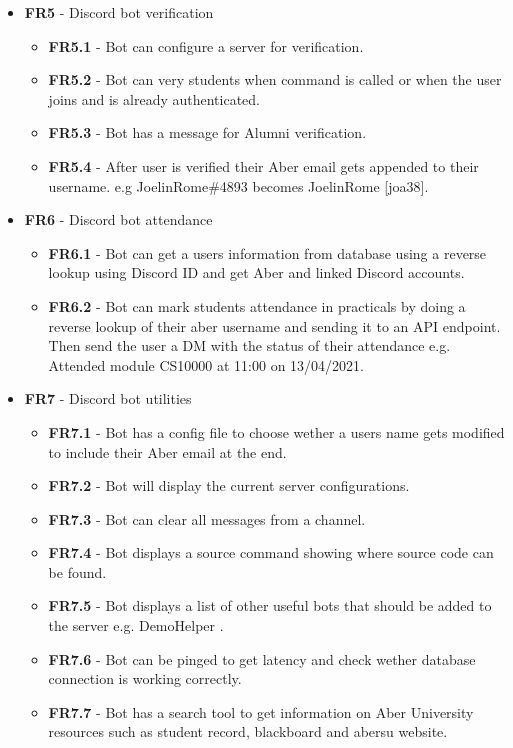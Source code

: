 \begin{itemize}
	\item \textbf{FR5} - Discord bot verification
	\begin{itemize}
		\item \textbf{FR5.1} - Bot can configure a server for verification.
		\item \textbf{FR5.2} - Bot can very students when command is called or when the user joins and is already authenticated.
		\item \textbf{FR5.3} - Bot has a message for Alumni verification.
		\item \textbf{FR5.4} - After user is verified their Aber email gets appended to their username. e.g JoelinRome\#4893 becomes JoelinRome [joa38].
	\end{itemize}

	\item \textbf{FR6} - Discord bot attendance
	\begin{itemize}
		\item \textbf{FR6.1} - Bot can get a users information from database using a reverse lookup using Discord ID and get Aber and linked Discord accounts.
		\item \textbf{FR6.2} - Bot can mark students attendance in practicals by doing a reverse lookup of their aber username and sending it to an API endpoint. Then send the user a DM with the status of their attendance e.g. Attended module CS10000 at 11:00 on 13/04/2021.
	\end{itemize}

	\item \textbf{FR7} - Discord bot utilities
	\begin{itemize}
		\item \textbf{FR7.1} - Bot has a config file to choose wether a users name gets modified to include their Aber email at the end.
		\item \textbf{FR7.2} - Bot will display the current server configurations.
		\item \textbf{FR7.3} - Bot can clear all messages from a channel.
		\item \textbf{FR7.4} - Bot displays a source command showing where source code can be found.
		\item \textbf{FR7.5} - Bot displays a list of other useful bots that should be added to the server e.g. DemoHelper \cite{demohelper}.
		\item \textbf{FR7.6} - Bot can be pinged to get latency and check wether database connection is working correctly.
		\item \textbf{FR7.7} - Bot has a search tool to get information on Aber University resources such as student record, blackboard and abersu website. 
	\end{itemize}


\end{itemize}
